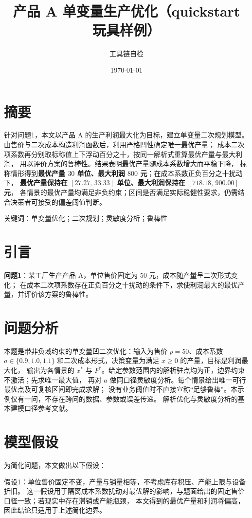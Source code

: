 \documentclass[11pt]{article}
\title{产品 A 单变量生产优化（quickstart 玩具样例）}
\author{工具链自检}
\date{\today}
\begin{document}
\maketitle

\section{摘要}
针对问题1，本文以产品 A 的生产利润最大化为目标，建立单变量二次规划模型。
由售价与二次成本构造利润函数后，利用严格凹性确定唯一最优产量；
成本二次项系数再分别取标称值上下浮动百分之十，按同一解析式重算最优产量与最大利润，
用以评价方案的鲁棒性。结果表明最优产量随成本系数增大而平稳下降，
标称情形得到\textbf{最优产量 $30$ 单位、最大利润 $800$ 元}；在成本系数正负百分之十扰动下，
\textbf{最优产量保持在 $[27.27,\,33.33]$ 单位、最大利润保持在 $[718.18,\,900.00]$ 元}，
各情景的最优产量均满足非负约束；区间是否满足实际稳健性要求，仍需结合决策者可接受的偏差阈值判断。

\noindent 关键词：单变量优化；二次规划；灵敏度分析；鲁棒性

\section{引言}
\textbf{问题1}：某工厂生产产品 A，单位售价固定为 50 元，成本随产量呈二次形式变化；
在成本二次项系数存在正负百分之十扰动的条件下，求使利润最大的最优产量，并评价该方案的鲁棒性。

\section{问题分析}
本题是带非负域约束的单变量凹二次优化：输入为售价 $p=50$、成本系数
$a\in\{0.9,1.0,1.1\}$ 和二次成本形式，决策变量为满足 $x\geq0$ 的产量，目标是利润最大化，
输出为各情景的 $x^*$ 与 $P^*$。给定参数范围内的解析驻点均为正，边界约束不激活；先求唯一最大值，
再对 $a$ 做同口径灵敏度分析。每个情景给出唯一可行最优点及可复核区间即完成求解；
没有业务阈值时不直接宣称“足够鲁棒”。本示例仅有一问，不存在跨问的数据、参数或误差传递。
解析优化与灵敏度分析的基本建模口径参考文献\cite{a,b}。

\section{模型假设}
为简化问题，本文做出以下假设：

假设1：单位售价固定不变，产量与销量相等，不考虑库存积压、产能上限与设备折旧。
这一假设用于隔离成本系数扰动对最优解的影响，与题面给出的固定售价口径一致；若现实中存在滞销或产能瓶颈，
本文得到的最优产量和利润将偏高，因此结论只适用于上述简化边界。
\end{document}
